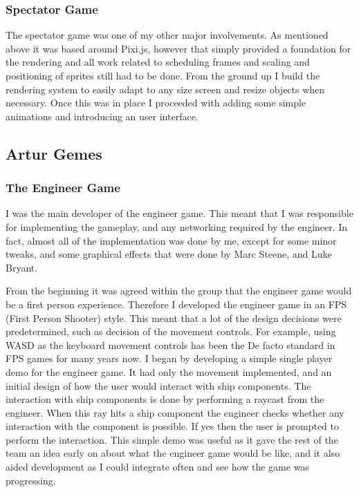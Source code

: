 \documentclass[a4paper,11pt]{article}
\begin{document}
\subsubsection{Spectator Game}

The spectator game was one of my other major involvements. As mentioned above it was based around Pixi.js, however that simply provided a foundation for the rendering and all work related to scheduling frames and scaling and positioning of sprites still had to be done. From the ground up I build the rendering system to easily adapt to any size screen and resize objects when necessary. Once this was in place I proceeded with adding some simple animations and introducing an user interface.

\clearpage

\subsection{Artur Gemes}

\subsubsection{The Engineer Game}

I was the main developer of the engineer game. This meant that I was responsible for implementing the gameplay, and any networking required by the engineer. In fact, almost all of the implementation was done by me, except for some minor tweaks, and some graphical effects that were done by Marc Steene, and Luke Bryant.

From the beginning it was agreed within the group that the engineer game would be a first person experience. Therefore I developed the engineer game in an FPS (First Person Shooter) style. This meant that a lot of the design decisions were predetermined, such as decision of the movement controls. For example, using WASD as the keyboard movement controls has been the De facto standard in FPS games for many years now. I began by developing a simple single player demo for the engineer game. It had only the movement implemented, and an initial design of how the user would interact with ship components. The interaction with ship components is done by performing a raycast from the engineer. When this ray hits a ship component the engineer checks whether any interaction with the component is possible. If yes then the user is prompted to perform the interaction. This simple demo was useful as it gave the rest of the team an idea early on about what the engineer game would be like, and it also aided development as I could integrate often and see how the game was progressing.
\end{document}
